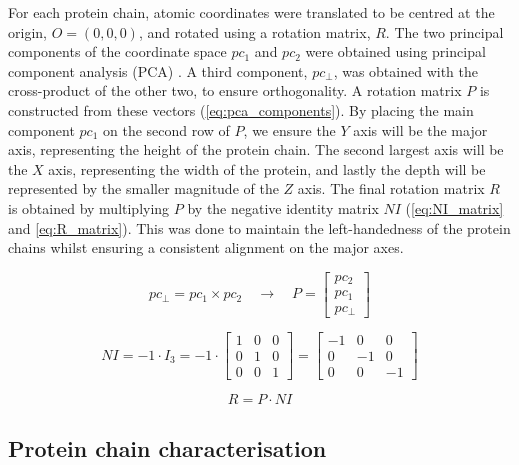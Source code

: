 For each protein chain, atomic coordinates were translated to be centred at the origin, $O = (0, 0, 0)$, and rotated using a rotation matrix, $R$. The two principal components of the coordinate space $pc_{1}$ and $pc_{2}$ were obtained using principal component analysis (PCA) \cite{HOTELLING_1933_PCA}. A third component, $pc_{\perp}$, was obtained with the cross-product of the other two, to ensure orthogonality. A rotation matrix $P$ is constructed from these vectors (\autoref{eq:pca_components}). By placing the main component $pc_{1}$ on the second row of $P$, we ensure the $Y$ axis will be the major axis, representing the height of the protein chain. The second largest axis will be the $X$ axis, representing the width of the protein, and lastly the depth will be represented by the smaller magnitude of the $Z$ axis. The final rotation matrix $R$ is obtained by multiplying $P$ by the negative identity matrix $NI$ (\autoref{eq:NI_matrix} and \autoref{eq:R_matrix}). This was done to maintain the left-handedness of the protein chains whilst ensuring a consistent alignment on the major axes.

\begin{equation}
pc_{\perp} = pc_{1} \times pc_{2} \quad \rightarrow \quad P = \begin{bmatrix}
pc_{2} \\
pc_{1} \\
pc_{\perp}
\end{bmatrix}
\label{eq:pca_components}
\end{equation}

\begin{equation}
NI = -1 \cdot I_3 = -1 \cdot \begin{bmatrix}
1 & 0 & 0 \\
0 & 1 & 0 \\
0 & 0 & 1 
\end{bmatrix} = \begin{bmatrix}
-1 & 0 & 0 \\
0 & -1 & 0 \\
0 & 0 & -1 
\end{bmatrix}
\label{eq:NI_matrix}
\end{equation}

\begin{equation}
R = P \cdot NI
\label{eq:R_matrix}
\end{equation}

\subsection{Protein chain characterisation}

